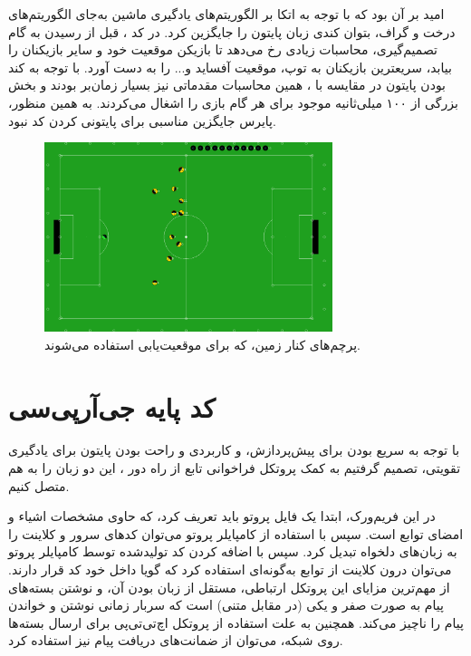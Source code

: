 امید بر آن بود که با توجه به اتکا بر الگوریتم‌های یادگیری ماشین به‌جای الگوریتم‌های درخت و گراف، بتوان کندی زبان پایتون را جایگزین کرد.
در کد ،
قبل از رسیدن به گام تصمیم‌گیری، محاسبات زیادی رخ می‌دهد تا بازیکن موقعیت خود و سایر بازیکنان را بیابد، سریعترین بازیکنان به توپ، موقعیت آفساید و... را به دست آورد.
با توجه به کند بودن پایتون در مقایسه با ،
همین محاسبات مقدماتی نیز بسیار زمان‌بر بودند و بخش بزرگی از ۱۰۰ میلی‌ثانیه موجود برای هر گام بازی را اشغال می‌کردند.
به همین منظور، پایرس جایگزین مناسبی برای پایتونی کردن کد نبود.

\begin{figure}[H]
    \centering
    \includegraphics[width=0.75\textwidth]{images/flags.png}
    \caption{پرچم‌های کنار زمین، که برای موقعیت‌یابی استفاده می‌شوند.}\label{fig:flags}
    
\end{figure}

\section{کد پایه جی‌آر‌پی‌سی}
با توجه به سریع بودن  
برای پیش‌پردازش،
و کاربردی و راحت بودن پایتون برای یادگیری تقویتی،
تصمیم گرفتیم به کمک پروتکل فراخوانی تابع از راه دور ،
این دو زبان را به هم متصل کنیم.

در این فریم‌ورک، ابتدا یک فایل پروتو  
باید تعریف کرد، که حاوی مشخصات اشیاء و امضای توابع است. سپس با استفاده از کامپایلر پروتو می‌توان کد‌های سرور و کلاینت را به زبان‌های دلخواه تبدیل کرد.
سپس با اضافه کردن کد تولید‌شده توسط کامپایلر پروتو می‌توان درون کلاینت از توابع به‌گونه‌ای استفاده کرد که گویا داخل خود کد قرار دارند. از مهم‌ترین مزایای
این پروتکل ارتباطی، مستقل از زبان بودن آن، و نوشتن بسته‌های پیام به صورت صفر و یکی (در مقابل متنی)  است که سربار زمانی نوشتن و خواندن پیام را ناچیز می‌کند.
همچنین به علت استفاده از پروتکل اچ‌تی‌تی‌پی  برای ارسال بسته‌ها روی شبکه، 
می‌توان از ضمانت‌های دریافت پیام نیز استفاده کرد.

